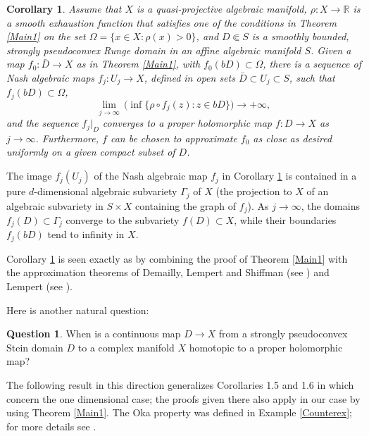\documentclass[11pt]{amsart}
\numberwithin{equation}{section}
\newtheorem{corollary}[theorem]{Corollary}
\theoremstyle{definition}
\newtheorem{question}[theorem]{Question}
\begin{document}
\begin{corollary}
\label{algebraic}
Assume that $X$ is a quasi-projective algebraic manifold,
$\rho\colon X\to {\mathbb{R}}$ is a smooth exhaustion 
function that satisfies one of the conditions in 
Theorem \ref{Main1} on the set $\Omega=\{x\in X\colon \rho(x)>0\}$,
and $D\Subset S$ is a smoothly bounded, 
strongly pseudoconvex Runge domain in an affine algebraic
manifold $S$. Given a map $f_0\colon \bar D \to X$ 
as in Theorem \ref{Main1}, with $f_0(bD)\subset \Omega$,
there is a sequence of 
Nash algebraic maps $f_j\colon U_j\to X$,
defined in open sets $\bar D\subset U_j\subset S$, 
such that $f_j(bD)\subset \Omega$, 
\[
	\lim_{j\to\infty} \, \bigl( \inf\{\rho\circ f_j(z) \colon z\in bD\}\bigr)  \to +\infty,
\]
and the sequence $f_j|_D$ converges to a proper holomorphic map $f\colon D\to X$
as $j\to\infty$. Furthermore, $f$ can be chosen to approximate $f_0$ as close 
as desired uniformly on a given compact subset of $D$.
\end{corollary}

The image $f_j(U_j)$ of the Nash algebraic map $f_j$ in 
Corollary \ref{algebraic} is contained in a pure 
$d$-dimensional algebraic subvariety $\varGamma_j$ of $X$
(the projection to $X$ of an algebraic subvariety in $S\times X$
containing the graph of $f_j$). As $j\to\infty$, the domains
$f_j(D)\subset \varGamma_j$ converge to the subvariety 
$f(D) \subset X$, while their boundaries $f_j(bD)$ tend to infinity in $X$.

Corollary \ref{algebraic} is seen exactly as \cite[Corollary 1.2]{BDF1} 
by combining the proof of Theorem \ref{Main1} with the  
approximation theorems of Demailly, Lempert and Shiffman 
(see \cite[Theorem 1.1]{DLS}) and Lempert (see \cite[Theorem 1.1]{Lempert}). 
 

Here is another natural question: 

\begin{question}
When is a continuous map $D\to X$ from a 
strongly pseudoconvex Stein domain $D$ to a complex manifold $X$
homotopic to a proper holomorphic map?
\end{question} 

The following result in this direction generalizes 
Corollaries 1.5 and 1.6 in \cite{BDF1} which concern 
the one dimensional case; the proofs given there
also apply in our case by using Theorem \ref{Main1}. 
The Oka property was defined in 
Example \ref{Counterex}; for more details see \cite{ANN}.
\end{document}
